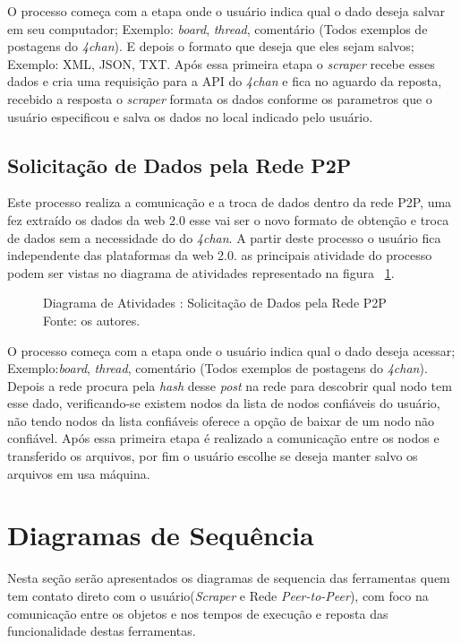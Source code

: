 O processo começa com a etapa onde o usuário indica qual o dado deseja salvar em seu computador; Exemplo: \textit{board}, \textit{thread}, comentário (Todos exemplos de postagens do \textit{4chan}). E depois o
formato que deseja que eles sejam salvos; Exemplo: XML, JSON, TXT. Após essa primeira etapa o \textit{scraper} recebe esses dados e cria uma requisição para a API do \textit{4chan} e fica no aguardo da
reposta, recebido a resposta o \textit{scraper} formata os dados conforme os parametros que o usuário especificou e salva os dados no local indicado pelo usuário.

\subsection{Solicitação de Dados pela Rede P2P\label{subsec:Solicitacao_Dados}}
Este processo realiza a comunicação e a troca de dados dentro da rede P2P, uma fez extraído os dados da web 2.0 esse vai ser o novo formato de obtenção e troca de dados sem a necessidade do 
do \textit{4chan}. A partir deste processo o usuário fica independente das plataformas da web 2.0. as principais atividade do processo podem ser vistas no diagrama de atividades 
representado na figura ~\ref{fig:Solicitacao_Dados}. 
\begin{figure}[H]
    
    \caption[Diagrama de Atividades : Solicitação de Dados pela Rede P2P]{\label{fig:Solicitacao_Dados}
        Diagrama de Atividades : Solicitação de Dados pela Rede P2P\\
        Fonte: os autores.
    }
\end{figure}
O processo começa com a etapa onde o usuário indica qual o dado deseja acessar; Exemplo:\textit{board}, \textit{thread}, comentário (Todos exemplos de postagens do \textit{4chan}). Depois a rede procura pela \textit{hash} desse \textit{post} na rede para descobrir qual nodo tem esse dado, verificando-se existem nodos da lista de nodos confiáveis do usuário, não tendo nodos da lista confiáveis oferece a opção de baixar
de um nodo não confiável. Após essa primeira etapa é realizado a comunicação entre os nodos e transferido os arquivos, por fim o usuário escolhe se deseja manter salvo os arquivos 
em usa máquina. 
\section{Diagramas de Sequência}
Nesta seção serão apresentados os diagramas de sequencia das ferramentas quem tem contato direto com o usuário(\textit{Scraper} e Rede \textit{Peer-to-Peer}), com foco na comunicação entre os objetos e nos tempos de execução e reposta das funcionalidade destas ferramentas.
